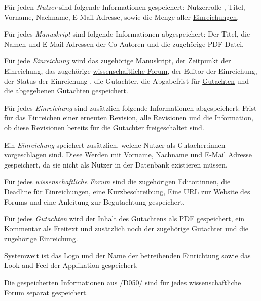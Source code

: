 
\begin{description}
	 Für jeden \emph{Nutzer} sind folgende Informationen gespeichert: Nutzerrolle , Titel, Vorname, Nachname, E-Mail Adresse, sowie die Menge aller \hyperref[d025]{Einreichungen}.
	
	 Für jedes \emph{Manuskript} sind folgende Informationen abgespeichert: Der Titel, die Namen und E-Mail Adressen der Co-Autoren und die zugehörige PDF Datei. 
	
	 Für jede \emph{Einreichung} wird das zugehörige \hyperref[d020]{Manuskript}, der Zeitpunkt der Einreichung, das zugehörige \hyperref[d030]{wissenschaftliche Forum}, der Editor  der Einreichung, der Status der Einreichung , die Gutachter, die Abgabefrist für \hyperref[d040]{Gutachten} und die abgegebenen \hyperref[d040]{Gutachten} gespeichert.
	
	 Für jedes \emph{Einreichung} sind zusätzlich folgende Informationen abgespeichert: Frist für das Einreichen einer erneuten Revision, alle Revisionen  und die Information, ob diese Revisionen bereits für die Gutachter freigeschaltet sind.
	
	 Ein \emph{Einreichung} speichert zusätzlich, welche Nutzer als Gutacher:innen vorgeschlagen sind. Diese Werden mit Vorname, Nachname und E-Mail Adresse gespeichert, da sie nicht als Nutzer in der Datenbank existieren müssen.
	
	 Für jedes \emph{wissenschaftliche Forum} sind die zugehörigen Editor:innen, die Deadline für \hyperref[d025]{Einreichungen}, eine Kurzbeschreibung, Eine URL zur Website des Forums und eine Anleitung zur Begutachtung gespeichert.
	
	 Für jedes \emph{Gutachten} wird der Inhalt des Gutachtens als PDF gespeichert, ein Kommentar als Freitext und zusätzlich noch der zugehörige Gutachter  und die zugehörige \hyperref[d025]{Einreichung}.
	
	 Systemweit ist das Logo und der Name der betreibenden Einrichtung sowie das Look and Feel der Applikation gespeichert.
	
	 Die gespeicherten Informationen aus \hyperref[d050]{/D050/} sind für jedes \hyperref[d030]{wissenschaftliche Forum} separat gespeichert.
\end{description}